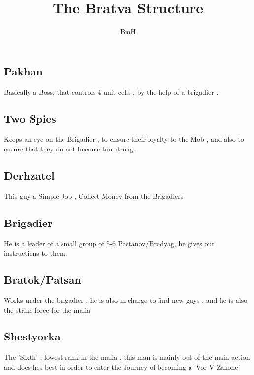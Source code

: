 \documentclass{article}
\author{BmH}
\title{The Bratva Structure}
\begin{document}
\maketitle

\begin{center}
\section{Pakhan}
\end{center}

Basically a Boss, that controls 4 unit cells , by the help of a brigadier .

\begin{center}
\section{Two Spies}
\end{center}

Keeps an eye on the Brigadier , to ensure their loyalty to the Mob , and also to ensure that they do not become too strong. 

\begin{center}
\section{Derhzatel}
\end{center}


This guy a Simple Job , Collect Money from the Brigadiers

\begin{center}
\section{Brigadier}
\end{center}


He is a leader of a small group of 5-6 Pastanov/Brodyag, he gives out instructions to them.

\begin{center}
\section{Bratok/Patsan}
\end{center}

Works under the brigadier , he is also in charge to find new guys , and he is also the strike force for the mafia

\begin{center}
\section{Shestyorka}
\end{center}


The 'Sixth' , lowest rank in the mafia , this man is mainly out of the main action and does hes best in order to enter the Journey of becoming a 'Vor V Zakone'
\end{document}
